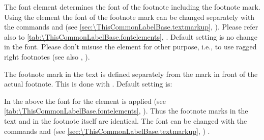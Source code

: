 \BeginIndexGroup
{}%
%
The%
 font element 
determines the font of the footnote including the footnote mark. Using the
element  the
font of the footnote mark can be changed separately with the commands
 and
 (see
\autoref{sec:\ThisCommonLabelBase.textmarkup},
). Please refer also to
\autoref{tab:\ThisCommonLabelBase.fontelements},
.
Default setting is no change in the font.%
 Please don't misuse the element for other purpose, i.e., to use ragged
right footnotes (see also ,
).

%
%
The footnote mark in the text is defined separately from the mark in
front of the actual footnote. This is done with
. Default setting is:
\begin{lstcode}
\end{lstcode}
In the above%
 the font for the element
 is
applied (see \autoref{tab:\ThisCommonLabelBase.fontelements},
). Thus the footnote marks
in the text and in the footnote itself are identical. The font can be changed
with the commands  and
 (see
\autoref{sec:\ThisCommonLabelBase.textmarkup},
)%
.

